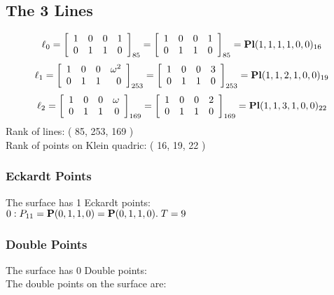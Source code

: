 \documentclass{article}
\newcommand{\bP}{{\bf P}}
\begin{document}
{\subsection*{The 3 Lines}
$$
\ell_{0} = 
\left[
\begin{array}{*{4}{r}}
1 & 0 & 0 & 1\\
0 & 1 & 1 & 0\\
\end{array}
\right]
_{85}
=
\left[
\begin{array}{*{4}c}
1  & 0  & 0  & 1\\
0  & 1  & 1  & 0\\
\end{array}
\right]_{85}
={\rm\bf Pl}(1,1,1,1,0,0 )_{16}$$
$$
\ell_{1} = 
\left[
\begin{array}{*{4}{r}}
1 & 0 & 0 & \omega^{2}\\
0 & 1 & 1 & 0\\
\end{array}
\right]
_{253}
=
\left[
\begin{array}{*{4}c}
1  & 0  & 0  & 3\\
0  & 1  & 1  & 0\\
\end{array}
\right]_{253}
={\rm\bf Pl}(1,1,2,1,0,0 )_{19}$$
$$
\ell_{2} = 
\left[
\begin{array}{*{4}{r}}
1 & 0 & 0 & \omega \\
0 & 1 & 1 & 0\\
\end{array}
\right]
_{169}
=
\left[
\begin{array}{*{4}c}
1  & 0  & 0  & 2\\
0  & 1  & 1  & 0\\
\end{array}
\right]_{169}
={\rm\bf Pl}(1,1,3,1,0,0 )_{22}$$
Rank of lines: ( 85, 253, 169 )\\
Rank of points on Klein quadric: ( 16, 19, 22 )\\
\subsubsection*{Eckardt Points}
The surface has 1 Eckardt points:\\
$0 : P_{11}=\bP(0, 1, 1, 0) = \bP(0, 1, 1, 0).\; T= 9$\\
\subsubsection*{Double Points}
The surface has 0 Double points:\\
The double points on the surface are:\\
\begin{multicols}{2}
\noindent
\end{multicols}
}
\end{document}
